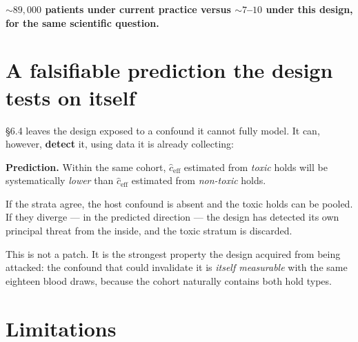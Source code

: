 \documentclass[11pt,a4paper]{article}
\begin{document}
\begin{center}
\textbf{${\sim}89{,}000$ patients under current practice versus ${\sim}7$--$10$ under
this design, for the same scientific question.}
\end{center}

\section{A falsifiable prediction the design tests on itself}\label{sec:predict}

\S6.4 leaves the design exposed to a confound it cannot fully model. It can, however,
\textbf{detect} it, using data it is already collecting:

\begin{tcolorbox}[keybox]
\textbf{Prediction.} Within the same cohort, $\hat{c}_{\mathrm{eff}}$ estimated from
\emph{toxic} holds will be systematically \emph{lower} than $\hat{c}_{\mathrm{eff}}$
estimated from \emph{non-toxic} holds.

If the strata agree, the host confound is absent and the toxic holds can be pooled.
If they diverge --- in the predicted direction --- the design has detected its own
principal threat from the inside, and the toxic stratum is discarded.
\end{tcolorbox}

This is not a patch. It is the strongest property the design acquired from being
attacked: the confound that could invalidate it is \emph{itself measurable} with the
same eighteen blood draws, because the cohort naturally contains both hold types.

\section{Limitations}\label{sec:limits}
\end{document}
